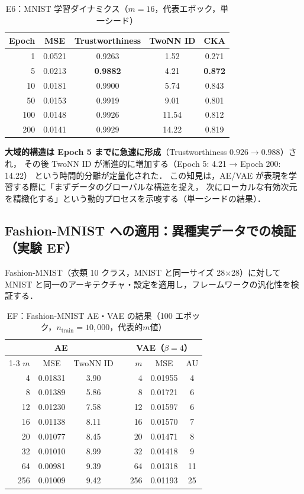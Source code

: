 \documentclass[11pt,a4paper]{jsarticle}
\begin{document}
\begin{table}[H]
\centering
\caption{E6：MNIST 学習ダイナミクス（$m=16$，代表エポック，単一シード）}
\label{tab:e6}
\small
\begin{tabular}{rcccc}
\toprule
Epoch & MSE & Trustworthiness & TwoNN ID & CKA \\
\midrule
1   & 0.0521 & 0.9263 & 1.52 & 0.271 \\
5   & 0.0213 & \textbf{0.9882} & 4.21 & \textbf{0.872} \\
10  & 0.0181 & 0.9900 & 5.74 & 0.843 \\
50  & 0.0153 & 0.9919 & 9.01 & 0.801 \\
100 & 0.0148 & 0.9926 & 11.54 & 0.812 \\
200 & 0.0141 & 0.9929 & 14.22 & 0.819 \\
\bottomrule
\end{tabular}
\end{table}

\textbf{大域的構造は Epoch 5 までに急速に形成}（Trustworthiness $0.926 \to 0.988$）され，
その後 TwoNN ID が漸進的に増加する（Epoch 5: 4.21 → Epoch 200: 14.22）
という時間的分離が定量化された．
この知見は，AE/VAE が表現を学習する際に「まずデータのグローバルな構造を捉え，
次にローカルな有効次元を精緻化する」という動的プロセスを示唆する（単一シードの結果）．

\subsection{Fashion-MNIST への適用：異種実データでの検証（実験 EF）}\label{sec:exp_fashion}

Fashion-MNIST（衣類 10 クラス，MNIST と同一サイズ 28×28）に対して
MNIST と同一のアーキテクチャ・設定を適用し，フレームワークの汎化性を検証する．

\begin{table}[H]
\centering
\caption{EF：Fashion-MNIST AE・VAE の結果（100 エポック，$n_{\mathrm{train}}=10{,}000$，代表的$m$値）}
\label{tab:ef}
\small
\begin{tabular}{rcccrcc}
\toprule
\multicolumn{3}{c}{AE} & \phantom{xx} & \multicolumn{3}{c}{VAE（$\beta=4$）} \\
\cmidrule{1-3}\cmidrule{5-7}
$m$ & MSE & TwoNN ID && $m$ & MSE & AU \\
\midrule
 4  & 0.01831 & 3.90 && 4  & 0.01955 & 4  \\
 8  & 0.01389 & 5.86 && 8  & 0.01721 & 6  \\
12  & 0.01230 & 7.58 && 12 & 0.01597 & 6  \\
16  & 0.01138 & 8.11 && 16 & 0.01570 & 7  \\
20  & 0.01077 & 8.45 && 20 & 0.01471 & 8  \\
32  & 0.01010 & 8.99 && 32 & 0.01418 & 9  \\
64  & 0.00981 & 9.39 && 64 & 0.01318 & 11 \\
256 & 0.01009 & 9.42 && 256& 0.01193 & 25 \\
\bottomrule
\end{tabular}
\end{table}
\end{document}
